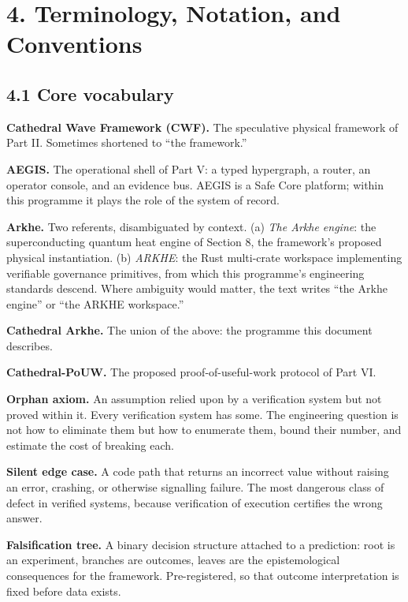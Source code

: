 \documentclass[
  11pt]{report}
\begin{document}
\hypertarget{terminology-notation-and-conventions}{%
\chapter{4. Terminology, Notation, and
Conventions}\label{terminology-notation-and-conventions}}

\hypertarget{core-vocabulary}{%
\section{4.1 Core vocabulary}\label{core-vocabulary}}

\textbf{Cathedral Wave Framework (CWF).} The speculative physical
framework of Part II. Sometimes shortened to ``the framework.''

\textbf{AEGIS.} The operational shell of Part V: a typed hypergraph, a
router, an operator console, and an evidence bus. AEGIS is a Safe Core
platform; within this programme it plays the role of the system of
record.

\textbf{Arkhe.} Two referents, disambiguated by context. (a) \emph{The
Arkhe engine}: the superconducting quantum heat engine of Section 8, the
framework's proposed physical instantiation. (b) \emph{ARKHE}: the Rust
multi-crate workspace implementing verifiable governance primitives,
from which this programme's engineering standards descend. Where
ambiguity would matter, the text writes ``the Arkhe engine'' or ``the
ARKHE workspace.''

\textbf{Cathedral Arkhe.} The union of the above: the programme this
document describes.

\textbf{Cathedral-PoUW.} The proposed proof-of-useful-work protocol of
Part VI.

\textbf{Orphan axiom.} An assumption relied upon by a verification
system but not proved within it. Every verification system has some. The
engineering question is not how to eliminate them but how to enumerate
them, bound their number, and estimate the cost of breaking each.

\textbf{Silent edge case.} A code path that returns an incorrect value
without raising an error, crashing, or otherwise signalling failure. The
most dangerous class of defect in verified systems, because verification
of execution certifies the wrong answer.

\textbf{Falsification tree.} A binary decision structure attached to a
prediction: root is an experiment, branches are outcomes, leaves are the
epistemological consequences for the framework. Pre-registered, so that
outcome interpretation is fixed before data exists.
\end{document}
